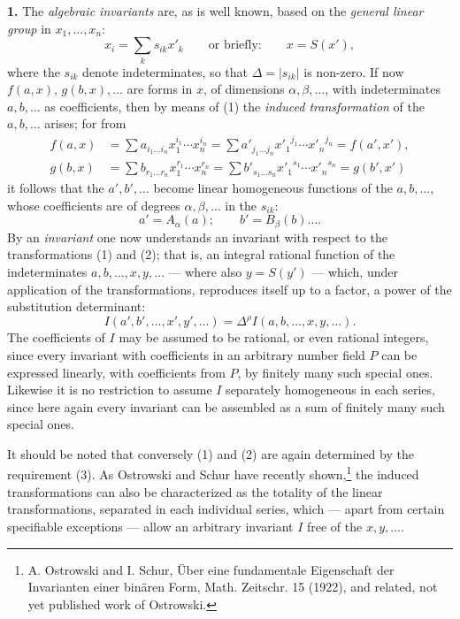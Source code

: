 \documentclass[11pt]{article}
\providecommand{\D}{\Delta}
\begin{document}
\textbf{1.} The \emph{algebraic invariants} are, as is well known, based on the \emph{general linear group} in $x_1,\ldots,x_n$:
\[
\tag{1}
x_i=\sum_k s_{ik}x'_k
\qquad\text{or briefly:}\qquad
x=S(x'),
\]
where the $s_{ik}$ denote indeterminates, so that $\D=|s_{ik}|$ is non-zero. If now $f(a,x)$, $g(b,x),\ldots$ are forms in $x$, of dimensions $\alpha,\beta,\ldots$, with indeterminates $a,b,\ldots$ as coefficients, then by means of (1) the \emph{induced transformation} of the $a,b,\ldots$ arises; for from
\[
\begin{aligned}
f(a,x)&=\sum a_{i_1\ldots i_n}x_1^{i_1}\cdots x_n^{i_n}
      =\sum a'_{j_1\ldots j_n}{x'_1}^{j_1}\cdots {x'_n}^{j_n}
      =f(a',x'),\\
g(b,x)&=\sum b_{r_1\ldots r_n}x_1^{r_1}\cdots x_n^{r_n}
      =\sum b'_{s_1\ldots s_n}{x'_1}^{s_1}\cdots {x'_n}^{s_n}
      =g(b',x')
\end{aligned}
\]
it follows that the $a',b',\ldots$ become linear homogeneous functions of the $a,b,\ldots$, whose coefficients are of degrees $\alpha,\beta,\ldots$ in the $s_{ik}$:
\[
\tag{2}
a'=A_\alpha(a);\qquad b'=B_\beta(b)\ldots .
\]
By an \emph{invariant} one now understands an invariant with respect to the transformations (1) and (2); that is, an integral rational function of the indeterminates $a,b,\ldots,x,y,\ldots$ --- where also $y=S(y')$ --- which, under application of the transformations, reproduces itself up to a factor, a power of the substitution determinant:
\[
\tag{3}
I(a',b',\ldots,x',y',\ldots)=\D^\rho I(a,b,\ldots,x,y,\ldots).
\]
The coefficients of $I$ may be assumed to be rational, or even rational integers, since every invariant with coefficients in an arbitrary number field $P$ can be expressed linearly, with coefficients from $P$, by finitely many such special ones. Likewise it is no restriction to assume $I$ separately homogeneous in each series, since here again every invariant can be assembled as a sum of finitely many such special ones.

It should be noted that conversely (1) and (2) are again determined by the requirement (3). As Ostrowski and Schur have recently shown,\footnote{A. Ostrowski and I. Schur, Über eine fundamentale Eigenschaft der Invarianten einer binären Form, Math. Zeitschr. 15 (1922), and related, not yet published work of Ostrowski.} the induced transformations can also be characterized as the totality of the linear transformations, separated in each individual series, which --- apart from certain specifiable exceptions --- allow an arbitrary invariant $I$ free of the $x,y,\ldots$.
\end{document}
